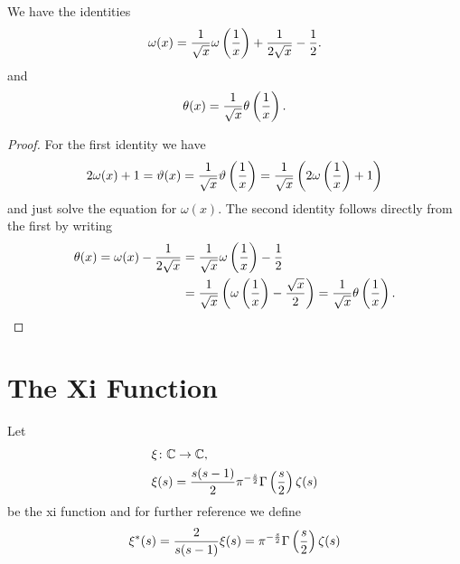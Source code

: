\begin{corollary}\label{cor:ThetaIdentity}
	We have the identities
\begin{equation*}
	\omega(x) = \frac{1}{\sqrt{x}} \omega\left(\frac{1}{x}\right) + \frac{1}{2\sqrt{x}} - \frac{1}{2}.
\end{equation*}
	and
\begin{equation*}
	\theta(x) = \frac{1}{\sqrt{x}} \theta\left(\frac{1}{x}\right).
\end{equation*}
\end{corollary}
\begin{proof}
	For the first identity we have
\begin{equation*}
	2 \omega(x) + 1 = \vartheta(x) = \frac{1}{\sqrt{x}} \vartheta\left(\frac{1}{x}\right) = \frac{1}{\sqrt{x}} \left(2 \omega\left(\frac{1}{x}\right) + 1\right)
\end{equation*}
	and just solve the equation for $\omega(x)$. The second identity follows directly from the first by writing
\begin{equation*}
\begin{aligned}	
	\theta(x) = \omega(x) - \frac{1}{2 \sqrt{x}} 
	&= \frac{1}{\sqrt{x}} \omega\left(\frac{1}{x}\right) - \frac{1}{2} \\ 
	&= \frac{1}{\sqrt{x}} \left(\omega\left(\frac{1}{x}\right) - \frac{\sqrt{x}}{2}\right) = \frac{1}{\sqrt{x}} \theta\left(\frac{1}{x}\right).
\end{aligned}
\end{equation*}
\end{proof}


\section{The Xi Function}


\begin{definition}\label{def:XiDefinition}
	Let
\begin{equation*}
\begin{aligned}
	&\xi \colon \mathbb{C} \to \mathbb{C}, \\
	&\xi(s) = \frac{s(s - 1)}{2} \pi ^{-\frac{s}{2}} \Gamma\left(\frac{s}{2}\right) \zeta(s)
\end{aligned}
\end{equation*}
	be the xi function and for further reference we define
\begin{equation*}
	\xi^*(s) = \frac{2}{s(s - 1)} \xi(s) = \pi ^{-\frac{s}{2}} \Gamma\left(\frac{s}{2}\right) \zeta(s)
\end{equation*}
\end{definition}


